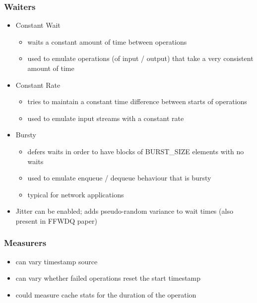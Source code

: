 \subsubsection{Waiters}
\begin{itemize}
    \item Constant Wait
        \begin{itemize}
            \item waits a constant amount of time between operations
            \item used to emulate operations (of input / output) that take a very consistent amount of time
        \end{itemize}
    \item Constant Rate
        \begin{itemize}
            \item tries to maintain a constant time difference between starts of operations
            \item used to emulate input streams with a constant rate
        \end{itemize}
    \item Bursty
        \begin{itemize}
            \item defers waits in order to have blocks of BURST\_SIZE elements with no waits
            \item used to emulate enqueue / dequeue behaviour that is bursty
            \item typical for network applications
        \end{itemize}
    \item Jitter can be enabled; adds pseudo-random variance to wait times (also present in FFWDQ paper)
\end{itemize}

\subsubsection{Measurers}
\begin{itemize}
    \item can vary timestamp source 
    \item can vary whether failed operations reset the start timestamp 
    \item could measure cache stats for the duration of the operation
\end{itemize}

